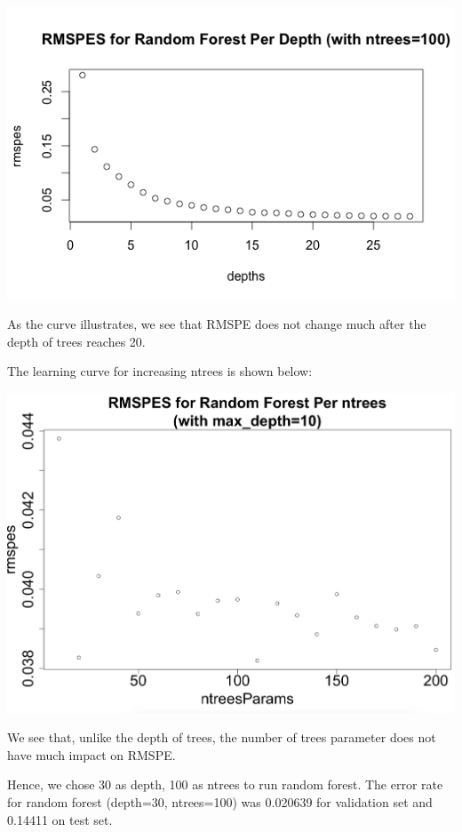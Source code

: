 \documentclass[letterpaper,twocolumn,11pt]{article}
\begin{document}
\includegraphics[scale=0.4]{img/RandomForestPerDepth.png}

As the curve illustrates, we see that RMSPE does not change much after the depth of trees reaches 20.

The learning curve for increasing ntrees is shown below:

\includegraphics[scale=0.22]{img/RandomForestPerNtrees.png}

We see that, unlike the depth of trees, the number of trees parameter does not have much impact on RMSPE.

Hence, we chose 30 as depth, 100 as ntrees to run random forest. The error rate for random forest (depth=30, ntrees=100) was 0.020639 for validation set and 0.14411 on test set.
\end{document}
